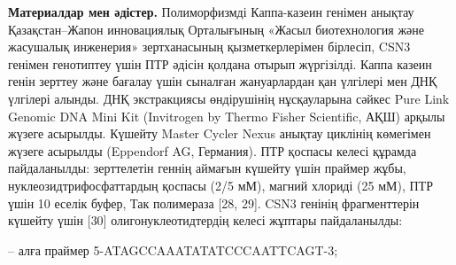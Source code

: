 \begin{multicols}{2}
{\bfseries Материалдар мен әдістер.} Полиморфизмді Каппа-казеин
генімен анықтау Қазақстан--Жапон инновациялық Орталығының «Жасыл
биотехнология және жасушалық инженерия» зертханасының қызметкерлерімен
бірлесіп, CSN3 генімен генотиптеу үшін ПТР әдісін қолдана отырып
жүргізілді. Каппа казеин генін зерттеу және бағалау үшін сыналған
жануарлардан қан үлгілері мен ДНҚ үлгілері алынды. ДНҚ экстракциясы
өндірушінің нұсқауларына сәйкес Pure Link Genomic DNA Mini Kit
(Invitrogen by Thermo Fisher Scientific, АҚШ) арқылы жүзеге асырылды.
Күшейту Master Cycler Nexus анықтау циклінің көмегімен жүзеге асырылды
(Eppendorf AG, Германия). ПТР қоспасы келесі құрамда пайдаланылды:
зерттелетін геннің аймағын күшейту үшін праймер жұбы,
нуклеозидтрифосфаттардың қоспасы (2/5 мМ), магний хлориді (25 мМ), ПТР
үшін 10 еселік буфер, Так полимераза {[}28, 29{]}. CSN3 генінің
фрагменттерін күшейту үшін {[}30{]} олигонуклеотидтердің келесі жұптары
пайдаланылды:
\end{multicols}

-- алға праймер
5\textquotesingle-ATAGCCAAATATATCCCAATTCAGT-3\textquotesingle;

